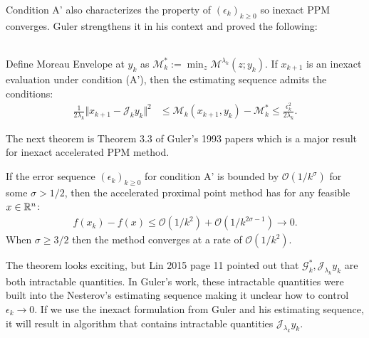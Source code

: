 \documentclass[12pt]{article}
\begin{document}
    Condition A' also characterizes the property of $(\epsilon_k)_{k\ge 0}$ so inexact PPM converges. 
    Guler strengthens it in his context and proved the following: 
    \begin{theorem}\label{thm:guler-inexact-ppm-bound}
        \;\\
        Define Moreau Envelope at $y_k$ as $\mathcal M_k^* := \min_z \mathcal {M}^{\lambda_k}(z; y_k)$. 
        If $x_{k +1}$ is an inexact evaluation under condition (A'), then the estimating sequence admits the conditions: 
        \begin{align*}
            \frac{1}{2\lambda_k} \Vert x_{k + 1} - \mathcal J_k y_k\Vert^2
            &\le 
            \mathcal M_k(x_{k + 1}, y_k) - \mathcal M^*_k
            \le \frac{\epsilon_k^2}{2\lambda_k}. 
        \end{align*}
    \end{theorem}
    The next theorem is Theorem 3.3 of Guler's 1993 papers which is a major result for inexact accelerated PPM method. 
    \begin{theorem}
        If the error sequence $(\epsilon_k)_{k \ge0}$ for condition A' is bounded by $\mathcal O(1/k^\sigma)$ for some $\sigma > 1/2$, then the accelerated proximal point method has for any feasible $x \in \mathbb R^n$: 
        \begin{align*}
            f(x_k) - f(x) \le \mathcal O(1/k^2) + \mathcal O (1 / k^{2\sigma - 1})\rightarrow 0. 
        \end{align*}    
        When $\sigma \ge 3/2$ then the method converges at a rate of $\mathcal O(1/k^2)$. 
    \end{theorem}
    The theorem looks exciting, but Lin 2015 \cite{lin_universal_2015} page 11 pointed out that $\mathcal G_k^*, \mathcal J_{\lambda_k} y_k$ are both intractable quantities. 
    In Guler's work, these intractable quantities were built into the Nesterov's estimating sequence making it unclear how to control $\epsilon_k \rightarrow 0$. 
    If we use the inexact formulation from Guler and his estimating sequence, it will result in algorithm that contains intractable quantities $\mathcal J_{\lambda_k} y_k$. 
\end{document}
